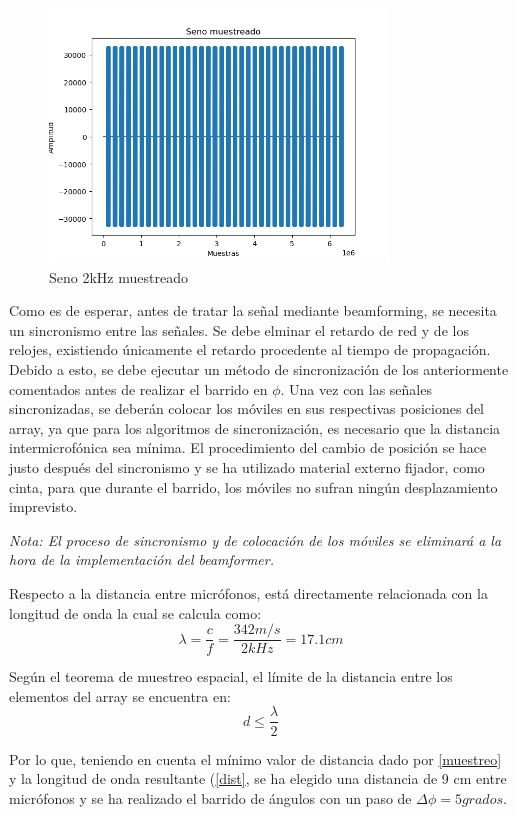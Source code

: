 \documentclass[a4paper,11pt]{book}
\begin{document}
\begin{figure}[hbtp]
\centering
\includegraphics[width = 9cm]{FIGURAS/seno.png}
\caption{Seno 2kHz muestreado}
\label{seno}
\end{figure}

Como es de esperar, antes de tratar la señal mediante beamforming, se necesita un sincronismo entre las señales. Se debe elminar el retardo de red y de los relojes, existiendo únicamente el retardo procedente al tiempo de propagación. Debido a esto, se debe ejecutar un método de sincronización de los anteriormente comentados antes de realizar el barrido en $\phi$. Una vez con las señales sincronizadas, se deberán colocar los móviles en sus respectivas posiciones del array, ya que para los algoritmos de sincronización, es necesario que la distancia intermicrofónica sea mínima. El procedimiento del cambio de posición se hace justo después del sincronismo y se ha utilizado material externo fijador, como cinta, para que durante el barrido, los móviles no sufran ningún desplazamiento imprevisto.

\textit{Nota: El proceso de sincronismo y de colocación de los móviles se eliminará a la hora de la implementación del beamformer.}

Respecto a la distancia entre micrófonos, está directamente relacionada con la longitud de onda la cual se calcula como:
\begin{equation}
\lambda = \frac{c}{f} = \frac{342 m/s}{2 kHz} = 17.1 cm
\label{dist}
\end{equation}

Según el teorema de muestreo espacial, el límite de la distancia entre los elementos del array se encuentra en:
\begin{equation}
d \leq \frac{\lambda}{2}
\label{muestreo}
\end{equation}

Por lo que, teniendo en cuenta el mínimo valor de distancia dado por \ref{muestreo} y la longitud de onda resultante (\ref{dist}, se ha elegido una distancia de 9 cm entre micrófonos y se ha realizado el barrido de ángulos con un paso de $\Delta\phi = 5 grados$.
\end{document}
